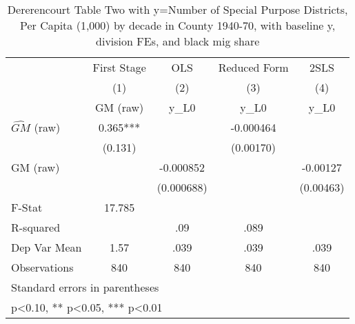 \begin{table}[htbp]\centering
\def\sym#1{\ifmmode^{#1}\else\(^{#1}\)\fi}
\caption{Dererencourt Table Two with y=Number of Special Purpose Districts, Per Capita (1,000) by decade in County 1940-70, with baseline y, division FEs, and black mig share}
\begin{tabular}{l*{4}{c}}
\toprule
                    & First Stage   &         OLS   &Reduced Form   &        2SLS   \\
                    &\multicolumn{1}{c}{(1)}&\multicolumn{1}{c}{(2)}&\multicolumn{1}{c}{(3)}&\multicolumn{1}{c}{(4)}\\
                    &\multicolumn{1}{c}{GM  (raw)}&\multicolumn{1}{c}{y\_L0}&\multicolumn{1}{c}{y\_L0}&\multicolumn{1}{c}{y\_L0}\\
\midrule
$\hat{GM}$ (raw)    &       0.365***&               &   -0.000464   &               \\
                    &     (0.131)   &               &   (0.00170)   &               \\
\addlinespace
GM  (raw)           &               &   -0.000852   &               &    -0.00127   \\
                    &               &  (0.000688)   &               &   (0.00463)   \\
\midrule
F-Stat              &      17.785   &               &               &               \\
R-squared           &               &         .09   &        .089   &               \\
Dep Var Mean        &        1.57   &        .039   &        .039   &        .039   \\
Observations        &         840   &         840   &         840   &         840   \\
\bottomrule
\multicolumn{5}{l}{\footnotesize Standard errors in parentheses}\\
\multicolumn{5}{l}{\footnotesize * p<0.10, ** p<0.05, *** p<0.01}\\
\end{tabular}
\end{table}
